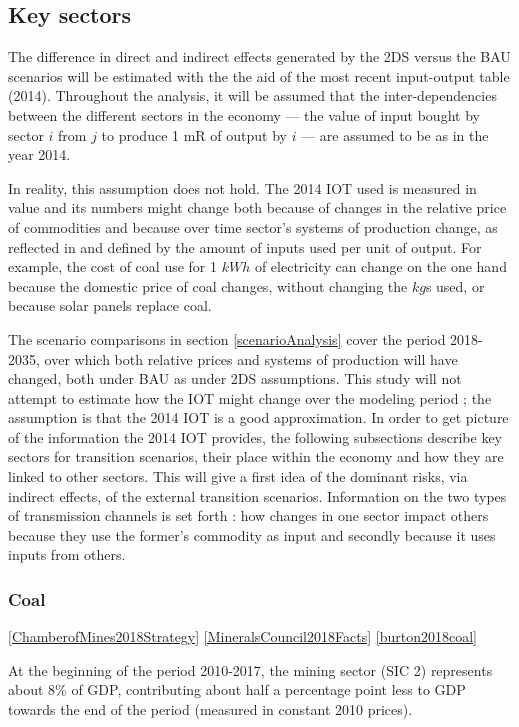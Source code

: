 \documentclass[12pt,english]{article}
\begin{document}
\clearpage

\subsection{Key sectors}
The difference in direct and indirect effects generated by the 2DS versus the BAU scenarios will be estimated with the the aid of the most recent input-output table (2014). Throughout the analysis, it will be assumed that the inter-dependencies between the different sectors in the economy --- the value of input bought by sector $i$ from $j$ to produce 1 mR of output by $i$ --- are assumed to be as in the year 2014. %

In reality, this assumption does not hold. The 2014 IOT used is measured in value and its numbers might change both because of changes in the relative price of commodities and because over time sector's systems of production change, as reflected in and defined by the amount of inputs used per unit of output. For example, the cost of coal use for 1 $kWh$ of electricity can change on the one hand because the domestic price of coal changes, without changing the $kg$s used, or because solar panels replace coal.

The scenario comparisons in section \ref{scenarioAnalysis} cover the period 2018-2035, over which both relative prices and systems of production will have changed, both under BAU as under 2DS assumptions. This study will not attempt to estimate how the IOT might change over the modeling period ; the assumption is that the 2014 IOT is a good approximation. In order to get picture of the information the 2014 IOT provides, the following subsections describe key sectors for transition scenarios, their place within the economy and how they are linked to other sectors. This will give a first idea of the dominant risks, via indirect effects, of the external transition scenarios. Information on the two types of transmission channels is set forth : how changes in one sector impact others because they use the former's commodity as input and secondly because it uses inputs from others. 


\subsubsection{Coal}

\ref{ChamberofMines2018Strategy}
\ref{MineralsCouncil2018Facts}
\ref{burton2018coal}

At the beginning of the period 2010-2017, the mining sector (SIC 2) represents about 8\% of GDP, contributing about half a percentage point less to GDP towards the end of the period \citep{P0441StatSA2018Q2} (measured in constant 2010 prices). 
\end{document}
